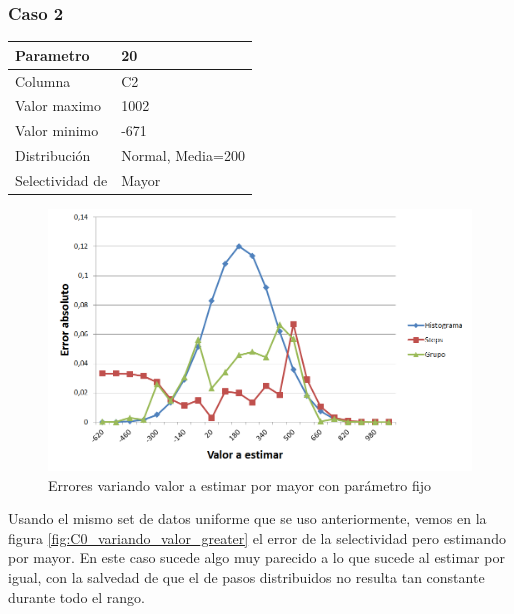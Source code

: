 		\subsubsection*{Caso 2}
		
		\begin{tabular}{| l | l |}
		\hline
		Parametro & 20 \\
		\hline
		Columna & C2 \\
		\hline
		Valor maximo & 1002 \\
		\hline
		Valor minimo & -671 \\
		\hline
		Distribuci\'on & Normal, Media=200 \\
		\hline
		Selectividad de & Mayor \\
		\hline
		\end{tabular}

	\quad
	
	\quad 				

	\begin{figure}[H]
	  \begin{center}
	    \includegraphics[scale=.55]{imagenes/C2_variando_valor_greater.png}
	    \caption{Errores variando valor a estimar por mayor con par\'ametro fijo} 
	    \label{fig:C2_variando_valor_greater}
	  \end{center}
	\end{figure}
		
		Usando el mismo set de datos uniforme que se uso anteriormente, vemos en la figura \ref{fig:C0_variando_valor_greater} el error de la selectividad pero estimando por mayor. En este caso sucede algo muy parecido a lo que sucede al estimar por igual, con la salvedad de que el de pasos distribuidos no resulta tan constante durante todo el rango.
		
